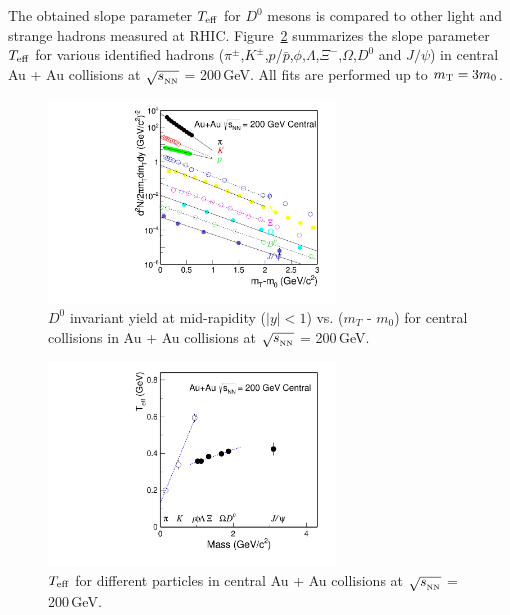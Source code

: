 The obtained slope parameter $T_{\rm eff}$ for $D^0$ mesons is compared to other light and strange hadrons measured at RHIC. %
Figure~\ref{Teff_ALL} summarizes the slope parameter $T_{\rm eff}$ for various identified hadrons ($\pi^{\pm}$,$K^{\pm}$,$p$/$\bar{p}$,$\phi$,$\Lambda$,$\Xi^-$,$\Omega$,$D^0$ and $J/\psi$) in central Au + Au collisions at $\sqrt{s_{_{\rm NN}}}$ = 200\,GeV. All fits are performed up to $m_{\rm T} = 3m_{0}$.


\begin{figure}
\centering
\includegraphics[width=0.68\textwidth]{figure/Run14_D0HFT/mTFit_ALL.pdf}
\caption{$D^{0}$ invariant yield at mid-rapidity ($|y|<1$) vs. ($m_{T}$ - $m_{0}$) for central collisions in Au + Au collisions at $\sqrt{s_{_{\rm NN}}}$ = 200\,GeV.}
\label{mTFit_ALL} 
\end{figure}

\begin{figure}
\centering
\includegraphics[width=0.68\textwidth]{figure/Run14_D0HFT/Teff_ALL.pdf}
\caption{$T_{\rm eff}$ for different particles in central Au + Au collisions at $\sqrt{s_{_{\rm NN}}}$ = 200\,GeV.}
\label{Teff_ALL} 
\end{figure}


